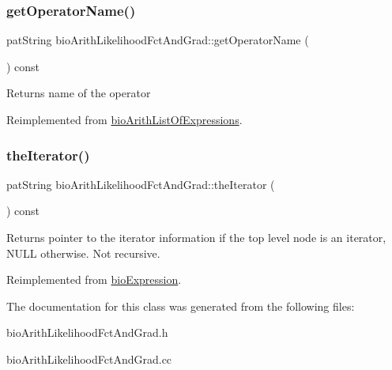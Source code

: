 \mbox{\label{classbio_arith_likelihood_fct_and_grad_ad181305327744af1de885d4169888378}} 
\subsubsection{\texorpdfstring{get\+Operator\+Name()}{getOperatorName()}}
{\footnotesize\ttfamily pat\+String bio\+Arith\+Likelihood\+Fct\+And\+Grad\+::get\+Operator\+Name (\begin{DoxyParamCaption}{ }\end{DoxyParamCaption}) const\hspace{0.3cm}{\ttfamily [virtual]}}

\begin{DoxyReturn}{Returns}
name of the operator 
\end{DoxyReturn}


Reimplemented from \hyperlink{classbio_arith_list_of_expressions_af0c6e016d69454ac0b7d4f889190807e}{bio\+Arith\+List\+Of\+Expressions}.

\mbox{\label{classbio_arith_likelihood_fct_and_grad_ab7df38cb82ae1a9b77d51445931e1ac9}} 
\subsubsection{\texorpdfstring{the\+Iterator()}{theIterator()}}
{\footnotesize\ttfamily pat\+String bio\+Arith\+Likelihood\+Fct\+And\+Grad\+::the\+Iterator (\begin{DoxyParamCaption}{ }\end{DoxyParamCaption}) const\hspace{0.3cm}{\ttfamily [virtual]}}

\begin{DoxyReturn}{Returns}
pointer to the iterator information if the top level node is an iterator, N\+U\+LL otherwise. Not recursive. 
\end{DoxyReturn}


Reimplemented from \hyperlink{classbio_expression_a9830c0cf012012c811b826adc54291f6}{bio\+Expression}.



The documentation for this class was generated from the following files\+:\begin{DoxyCompactItemize}
\item 
bio\+Arith\+Likelihood\+Fct\+And\+Grad.\+h\item 
bio\+Arith\+Likelihood\+Fct\+And\+Grad.\+cc\end{DoxyCompactItemize}
